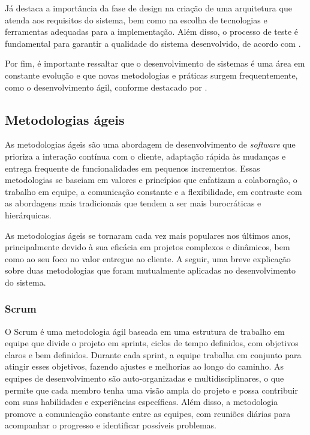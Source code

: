 Já \cite{somerville2015engenharia} destaca a importância da fase de design na criação de uma arquitetura que atenda aos requisitos do sistema, bem como na escolha de tecnologias e ferramentas adequadas para a implementação. Além disso, o processo de teste é fundamental para garantir a qualidade do sistema desenvolvido, de acordo com \cite{myers2012art}. 

Por fim, é importante ressaltar que o desenvolvimento de sistemas é uma área em constante evolução e que novas metodologias e práticas surgem frequentemente, como o desenvolvimento ágil, conforme destacado por \cite{martin2008agile}.
\subsection{Metodologias ágeis}\label{ssec:metodologias_ageis}
As metodologias ágeis são uma abordagem de desenvolvimento de \textit{software} que prioriza a interação contínua com o cliente, adaptação rápida às mudanças e entrega frequente de funcionalidades em pequenos incrementos. Essas metodologias se baseiam em valores e princípios que enfatizam a colaboração, o trabalho em equipe, a comunicação constante e a flexibilidade, em contraste com as abordagens mais tradicionais que tendem a ser mais burocráticas e hierárquicas. 

As metodologias ágeis se tornaram cada vez mais populares nos últimos anos, principalmente devido à sua eficácia em projetos complexos e dinâmicos, bem como ao seu foco no valor entregue ao cliente. A seguir, uma breve explicação sobre duas metodologias que foram mutualmente aplicadas no desenvolvimento do sistema.
\subsubsection{Scrum}\label{sssec:scrum}
O Scrum é uma metodologia ágil baseada em uma estrutura de trabalho em equipe que divide o projeto em sprints, ciclos de tempo definidos, com objetivos claros e bem definidos. Durante cada sprint, a equipe trabalha em conjunto para atingir esses objetivos, fazendo ajustes e melhorias ao longo do caminho. As equipes de desenvolvimento são auto-organizadas e multidisciplinares, o que permite que cada membro tenha uma visão ampla do projeto e possa contribuir com suas habilidades e experiências específicas. Além disso, a metodologia promove a comunicação constante entre as equipes, com reuniões diárias para acompanhar o progresso e identificar possíveis problemas.

